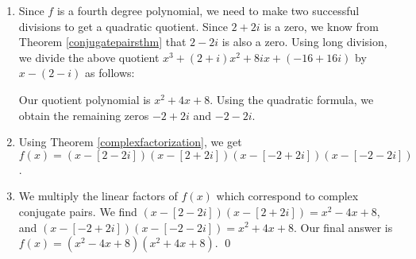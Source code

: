 {
\begin{enumerate}

{We divide $f(x)$ by $x-(2+2i)$ using long division as follows:}


\item  Since $f$ is a fourth degree polynomial, we need to make two successful divisions to get a quadratic quotient.  Since $2+2i$ is a zero, we know from Theorem \ref{conjugatepairsthm} that $2-2i$ is also a zero.  
{Using long division, we divide the above quotient $x^3+(2+i)x^2+8ix+(-16+16i)$ by $x-(2-i)$ as follows:}

Our quotient polynomial is $x^2+4x+8$.  Using the quadratic formula, we obtain the remaining zeros $-2+2i$ and $-2-2i$.  

\item  Using Theorem \ref{complexfactorization}, we get $f(x) = (x-[2-2i])(x-[2+2i])(x-[-2+2i])(x-[-2-2i])$.

\item  We multiply the linear factors of $f(x)$ which correspond to complex conjugate pairs.  We find $(x-[2-2i])(x-[2+2i]) = x^2-4x+8$, and $(x-[-2+2i])(x-[-2-2i]) = x^2+4x+8$.  Our final answer is $f(x) =  \left(x^2-4x+8\right) \left(x^2+4x+8\right)$. \qed

\end{enumerate}
}

